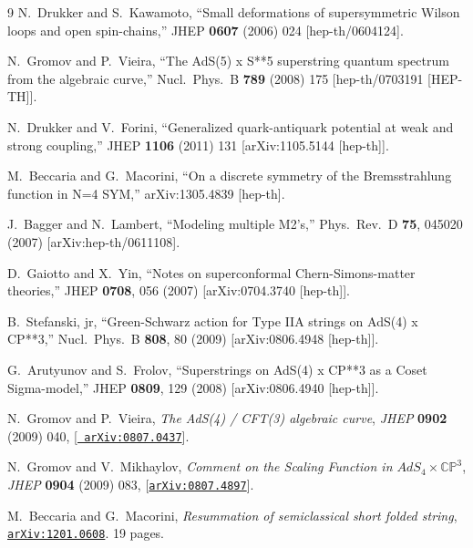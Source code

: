 \documentclass[a4paper,11pt]{article}
\numberwithin{equation}{section}
\begin{document}
\begin{thebibliography} {9}
  N.~Drukker and S.~Kawamoto,
  ``Small deformations of supersymmetric Wilson loops and open spin-chains,''
  JHEP {\bf 0607} (2006) 024
  [hep-th/0604124].

  N.~Gromov and P.~Vieira,
  ``The AdS(5) x S**5 superstring quantum spectrum from the algebraic curve,''
  Nucl.\ Phys.\ B {\bf 789} (2008) 175
  [hep-th/0703191 [HEP-TH]].

  N.~Drukker and V.~Forini,
  ``Generalized quark-antiquark potential at weak and strong coupling,''
  JHEP {\bf 1106} (2011) 131
  [arXiv:1105.5144 [hep-th]].

  M.~Beccaria and G.~Macorini,
  ``On a discrete symmetry of the Bremsstrahlung function in N=4 SYM,''
  arXiv:1305.4839 [hep-th].

  J.~Bagger and N.~Lambert,
  ``Modeling multiple M2's,''
  Phys.\ Rev.\  D {\bf 75}, 045020 (2007)
  [arXiv:hep-th/0611108].

D.~Gaiotto and X.~Yin,
  ``Notes on superconformal Chern-Simons-matter theories,''
  JHEP {\bf 0708}, 056 (2007)
  [arXiv:0704.3740 [hep-th]]. 

  B.~Stefanski, jr,
  ``Green-Schwarz action for Type IIA strings on AdS(4) x CP**3,''
  Nucl.\ Phys.\ B {\bf 808}, 80 (2009)
  [arXiv:0806.4948 [hep-th]].

  G.~Arutyunov and S.~Frolov,
  ``Superstrings on AdS(4) x CP**3 as a Coset Sigma-model,''
  JHEP {\bf 0809}, 129 (2008)
  [arXiv:0806.4940 [hep-th]].

N.~Gromov and P.~Vieira, {\it {The AdS(4) / CFT(3) algebraic curve}},  {\em
  JHEP} {\bf 0902} (2009) 040, [\href{http://xxx.lanl.gov/abs/0807.0437}{{\tt
  arXiv:0807.0437}}].

N.~Gromov and V.~Mikhaylov, {\it {Comment on the Scaling Function in
  $AdS_{4}\times \mathbb{CP}^{3}$}},  {\em JHEP} {\bf 0904} (2009) 083,
  [\href{http://xxx.lanl.gov/abs/0807.4897}{{\tt arXiv:0807.4897}}].

M.~Beccaria and G.~Macorini, {\it {Resummation of semiclassical short folded
  string}},  \href{http://xxx.lanl.gov/abs/1201.0608}{{\tt arXiv:1201.0608}}.
  19 pages.


\end{thebibliography}
\end{document}
